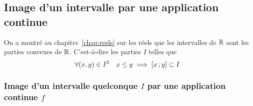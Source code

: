 \subsection{Image d'un intervalle par une application continue}

\begin{rappel}
  On a montré au chapitre~\ref{chap:reels} sur les réels que les intervalles de $\mathbb{R}$ sont les parties convexes de $\mathbb{R}$. C'est-à-dire les parties $I$ telles que
  \begin{equation}
    \forall (x,y) \in I^2 \quad x \leq y \implies \left[ x \, ;  y \right] \subset I
  \end{equation}
\end{rappel}

\subsubsection[Image continue d'un intervalle quelconque]{Image d'un intervalle quelconque $I$ par une application continue $f$}

